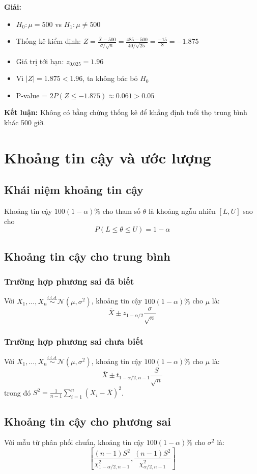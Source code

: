 \textbf{Giải:}
\begin{itemize}
    \item $H_0: \mu = 500$ vs $H_1: \mu \neq 500$
    \item Thống kê kiểm định: $Z = \frac{\overline{X} - 500}{\sigma/\sqrt{n}} = \frac{485 - 500}{40/\sqrt{25}} = \frac{-15}{8} = -1.875$
    \item Giá trị tới hạn: $z_{0.025} = 1.96$
    \item Vì $|Z| = 1.875 < 1.96$, ta không bác bỏ $H_0$
    \item P-value = $2P(Z \leq -1.875) \approx 0.061 > 0.05$
\end{itemize}

\textbf{Kết luận:} Không có bằng chứng thống kê để khẳng định tuổi thọ trung bình khác 500 giờ.



\section{Khoảng tin cậy và ước lượng}



\subsection{Khái niệm khoảng tin cậy}
\begin{dn}
Khoảng tin cậy $100(1-\alpha)\%$ cho tham số $\theta$ là khoảng ngẫu nhiên $[L, U]$ sao cho
\[
P(L \leq \theta \leq U) = 1-\alpha
\]
\end{dn}

\subsection{Khoảng tin cậy cho trung bình}
\subsubsection*{Trường hợp phương sai đã biết}
Với $X_1, \ldots, X_n \overset{i.i.d.}{\sim} \mathcal{N}(\mu, \sigma^2)$, khoảng tin cậy $100(1-\alpha)\%$ cho $\mu$ là:
\[
\overline{X} \pm z_{1-\alpha/2} \frac{\sigma}{\sqrt{n}}
\]

\subsubsection*{Trường hợp phương sai chưa biết}
Với $X_1, \ldots, X_n \overset{i.i.d.}{\sim} \mathcal{N}(\mu, \sigma^2)$, khoảng tin cậy $100(1-\alpha)\%$ cho $\mu$ là:
\[
\overline{X} \pm t_{1-\alpha/2, n-1} \frac{S}{\sqrt{n}}
\]
trong đó $S^2 = \frac{1}{n-1}\sum_{i=1}^n (X_i - \overline{X})^2$.

\subsection{Khoảng tin cậy cho phương sai}
Với mẫu từ phân phối chuẩn, khoảng tin cậy $100(1-\alpha)\%$ cho $\sigma^2$ là:
\[
\left[\frac{(n-1)S^2}{\chi^2_{1-\alpha/2, n-1}}, \frac{(n-1)S^2}{\chi^2_{\alpha/2, n-1}}\right]
\]



